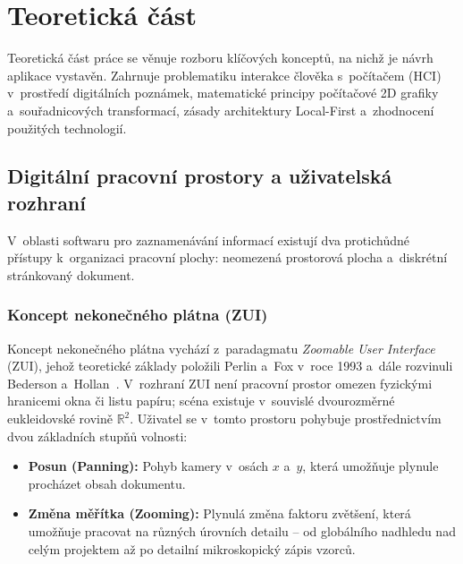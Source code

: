 \documentclass[12pt, a4paper, oneside]{article}
\begin{document}
\section{Teoretická část}
\label{sec:teoreticka_cast}

Teoretická část práce se věnuje rozboru klíčových konceptů, na nichž je návrh aplikace vystavěn. Zahrnuje problematiku interakce člověka s~počítačem (HCI) v~prostředí digitálních poznámek, matematické principy počítačové 2D grafiky a~souřadnicových transformací, zásady architektury Local-First a~zhodnocení použitých technologií.

\subsection{Digitální pracovní prostory a uživatelská rozhraní}
\label{sec:teorie_zui}

V~oblasti softwaru pro zaznamenávání informací existují dva protichůdné přístupy k~organizaci pracovní plochy: neomezená prostorová plocha a~diskrétní stránkovaný dokument.

\subsubsection{Koncept nekonečného plátna (ZUI)}
Koncept nekonečného plátna vychází z~paradagmatu \textit{Zoomable User Interface} (ZUI), jehož teoretické základy položili Perlin a~Fox v~roce 1993 a~dále rozvinuli Bederson a~Hollan~\cite{bederson1994pad}. V~rozhraní ZUI není pracovní prostor omezen fyzickými hranicemi okna či listu papíru; scéna existuje v~souvislé dvourozměrné eukleidovské rovině $\mathbb{R}^2$. Uživatel se v~tomto prostoru pohybuje prostřednictvím dvou základních stupňů volnosti:
\begin{itemize}
    \item \textbf{Posun (Panning):} Pohyb kamery v~osách $x$ a~$y$, která umožňuje plynule procházet obsah dokumentu.
    \item \textbf{Změna měřítka (Zooming):} Plynulá změna faktoru zvětšení, která umožňuje pracovat na různých úrovních detailu -- od globálního nadhledu nad celým projektem až po detailní mikroskopický zápis vzorců.
\end{itemize}
\end{document}
